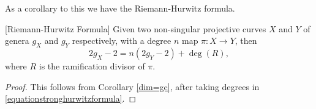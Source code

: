 As a corollary to this we have the Riemann-Hurwitz formula.

    \begin{cor}\label{hur}[Riemann-Hurwitz Formula]
    Given two non-singular projective curves $X$ and $Y$ of genera $g_X$ and $g_Y$ respectively, with a degree $n$ map $\pi\colon X \rightarrow Y$, then
        \[
        2g_X - 2 = n(2g_Y -2) + \deg(R),
        \]
    where $R$ is the ramification divisor of $\pi$.
    \end{cor}
    \begin{proof}
    This follows from Corollary \ref{dim=gc}, after taking degrees in \eqref{equationstronghurwitzformula}.
    \end{proof}




















